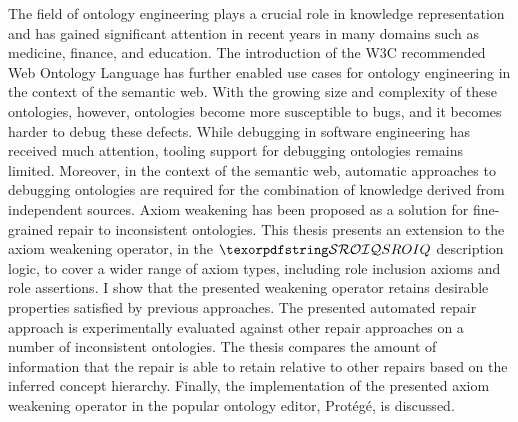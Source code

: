 The field of ontology engineering plays a crucial role in knowledge representation and has gained significant attention in recent years in many domains such as medicine, finance, and education. The introduction of the W3C recommended Web Ontology Language has further enabled use cases for ontology engineering in the context of the semantic web. With the growing size and complexity of these ontologies, however, ontologies become more susceptible to bugs, and it becomes harder to debug these defects. While debugging in software engineering has received much attention, tooling support for debugging ontologies remains limited. Moreover, in the context of the semantic web, automatic approaches to debugging ontologies are required for the combination of knowledge derived from independent sources. Axiom weakening has been proposed as a solution for fine-grained repair to inconsistent ontologies. This thesis presents an extension to the axiom weakening operator, in the $\SROIQ$ description logic, to cover a wider range of axiom types, including role inclusion axioms and role assertions. I show that the presented weakening operator retains desirable properties satisfied by previous approaches. The presented automated repair approach is experimentally evaluated against other repair approaches on a number of inconsistent ontologies. The thesis compares the amount of information that the repair is able to retain relative to other repairs based on the inferred concept hierarchy. Finally, the implementation of the presented axiom weakening operator in the popular ontology editor, Protégé, is discussed.

